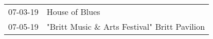 \begin{supertabular}{p{0.25\columnwidth}p{0.75\columnwidth}}
 07-03-19 &                                House of Blues \\
 07-05-19 &  "Britt Music \& Arts Festival" Britt Pavilion \\
\end{supertabular}
